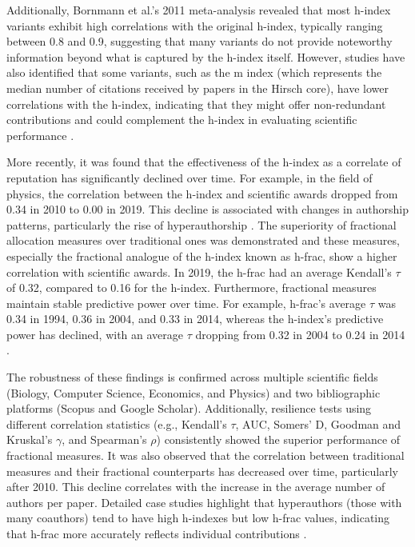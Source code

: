 Additionally, Bornmann et al.'s 2011 meta-analysis revealed that most h-index
variants exhibit high correlations with the original h-index, typically ranging
between 0.8 and 0.9, suggesting that many variants do not provide noteworthy
information beyond what is captured by the h-index itself. However, studies
have also identified that some variants, such as the m index (which represents
the median number of citations received by papers in the Hirsch core), have
lower correlations with the h-index, indicating that they might offer
non-redundant contributions and could complement the h-index in evaluating
scientific performance \cite{bornmann2011multilevel, bornmann2008are}.

More recently, it was found that the effectiveness of the h-index as a
correlate of reputation has significantly declined over time. For example, in
the field of physics, the correlation between the h-index and scientific awards
dropped from 0.34 in 2010 to 0.00 in 2019. This decline is associated with
changes in authorship patterns, particularly the rise of hyperauthorship
\cite{koltun2021h}. The superiority of fractional allocation measures over
traditional ones was demonstrated and these measures, especially the fractional
analogue of the h-index known as h-frac, show a higher correlation with
scientific awards. In 2019, the h-frac had an average Kendall’s $\tau$ of 0.32,
compared to 0.16 for the h-index. Furthermore, fractional measures maintain
stable predictive power over time. For example, h-frac's average $\tau$ was
0.34 in 1994, 0.36 in 2004, and 0.33 in 2014, whereas the h-index's predictive
power has declined, with an average $\tau$ dropping from 0.32 in 2004 to 0.24
in 2014 \cite{koltun2021h}.

The robustness of these findings is confirmed across multiple scientific fields
(Biology, Computer Science, Economics, and Physics) and two bibliographic
platforms (Scopus and Google Scholar). Additionally, resilience tests using
different correlation statistics (e.g., Kendall’s $\tau$, AUC, Somers’ D,
Goodman and Kruskal’s $\gamma$, and Spearman’s $\rho$) consistently showed the
superior performance of fractional measures. It was also observed that the
correlation between traditional measures and their fractional counterparts has
decreased over time, particularly after 2010. This decline correlates with the
increase in the average number of authors per paper. Detailed case studies
highlight that hyperauthors (those with many coauthors) tend to have high
h-indexes but low h-frac values, indicating that h-frac more accurately
reflects individual contributions \cite{koltun2021h}.


